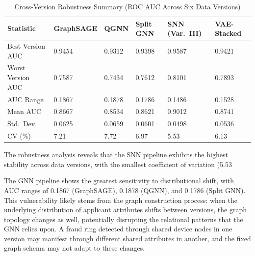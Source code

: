 \begin{table}[H]
\centering
\caption{Cross-Version Robustness Summary (ROC AUC Across Six Data Versions)}
\label{tab:ch8-robustness}
\small
\setlength{\tabcolsep}{5pt}
\begin{tabularx}{\textwidth}{>{\RaggedRight\arraybackslash}p{3.8cm} X X X X X}
\toprule
\textbf{Statistic} & \textbf{Graph\newline SAGE} & \textbf{QGNN} & \textbf{Split GNN} & \textbf{SNN (Var.\ III)} & \textbf{VAE-Stacked} \\
\midrule
Best Version AUC & 0.9454 & 0.9312 & 0.9398 & 0.9587 & 0.9421 \\
Worst Version AUC & 0.7587 & 0.7434 & 0.7612 & 0.8101 & 0.7893 \\
AUC Range & 0.1867 & 0.1878 & 0.1786 & 0.1486 & 0.1528 \\
Mean AUC & 0.8667 & 0.8534 & 0.8621 & 0.9012 & 0.8741 \\
Std.\ Dev. & 0.0625 & 0.0659 & 0.0601 & 0.0498 & 0.0536 \\
CV (\%) & 7.21 & 7.72 & 6.97 & 5.53 & 6.13 \\
\bottomrule
\end{tabularx}
\end{table}

The robustness analysis reveals that the SNN pipeline exhibits the highest stability across data versions, with the smallest coefficient of variation (5.53%

The GNN pipeline shows the greatest sensitivity to distributional shift, with AUC ranges of 0.1867 (GraphSAGE), 0.1878 (QGNN), and 0.1786 (Split GNN). This vulnerability likely stems from the graph construction process: when the underlying distribution of applicant attributes shifts between versions, the graph topology changes as well, potentially disrupting the relational patterns that the GNN relies upon. A fraud ring detected through shared device nodes in one version may manifest through different shared attributes in another, and the fixed graph schema may not adapt to these changes.

